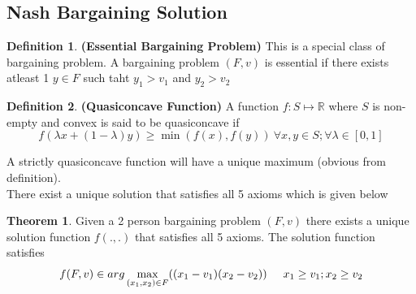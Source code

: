 \documentclass{article}
\theoremstyle{definition}
\newtheorem{theorem}{Theorem}[section]
\newtheorem{defn}{Definition}[section]
\begin{document}
\subsection{Nash Bargaining Solution}
\begin{defn}
\textbf{(Essential Bargaining Problem)} This is a special class of bargaining problem. A bargaining problem $(F,v)$ is essential if there exists atleast 1 $y\in F$ such taht $y_1>v_1$ and $y_2>v_2$
\end{defn}
\begin{defn}
\textbf{(Quasiconcave Function)} A function $f:S\mapsto\mathbb{R}$ where $S$ is non-empty and convex is said to be quasiconcave if $$f(\lambda x + (1-\lambda)y) \geq \min (f(x),f(y))~\forall x,y\in S;\forall \lambda \in [0,1]$$
\end{defn}
A strictly quasiconcave function will have a unique maximum (obvious from definition).\\
There exist a unique solution that satisfies all 5 axioms which is given below
\begin{theorem}
Given a 2 person bargaining problem $(F,v)$ there exists a unique solution function $f(.,.)$ that satisfies all 5 axioms. The solution function satisfies
$$ f(F,v) \in arg\max_{(x_1,x_2)\in F} ((x_1-v_1)(x_2-v_2)) \hspace{5mm} x_1\geq v_1; x_2\geq v_2 $$
\end{theorem}
\end{document}
